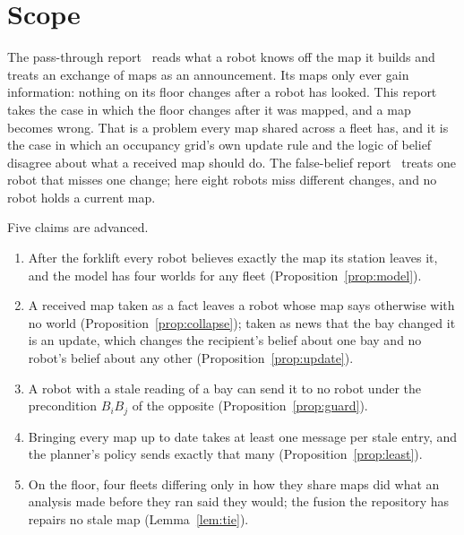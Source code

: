 \documentclass[11pt,a4paper]{article}
\theoremstyle{definition}
\newcommand{\Bop}[1]{B_{#1}}
\begin{document}
\tableofcontents
\newpage

\section{Scope}
\label{sec:scope}

The pass-through report~\cite{ulises2026pt} reads what a robot knows off the map
it builds and treats an exchange of maps as an announcement. Its maps only ever
gain information: nothing on its floor changes after a robot has looked. This
report takes the case in which the floor changes after it was mapped, and a map
becomes wrong. That is a problem every map shared across a fleet has, and it is
the case in which an occupancy grid's own update rule and the logic of belief
disagree about what a received map should do. The false-belief
report~\cite{ulises2026fb} treats one robot that misses one change; here eight
robots miss different changes, and no robot holds a current map.

Five claims are advanced.

\begin{enumerate}[leftmargin=1.4em, itemsep=2pt]
  \item After the forklift every robot believes exactly the map its station
        leaves it, and the model has four worlds for any fleet
        (Proposition~\ref{prop:model}).
  \item A received map taken as a fact leaves a robot whose map says otherwise
        with no world (Proposition~\ref{prop:collapse}); taken as news that the
        bay changed it is an update, which changes the recipient's belief about
        one bay and no robot's belief about any other (Proposition~\ref{prop:update}).
  \item A robot with a stale reading of a bay can send it to no robot under the
        precondition $\Bop{i}\Bop{j}$ of the opposite (Proposition~\ref{prop:guard}).
  \item Bringing every map up to date takes at least one message per stale entry,
        and the planner's policy sends exactly that many
        (Proposition~\ref{prop:least}).
  \item On the floor, four fleets differing only in how they share maps did what
        an analysis made before they ran said they would; the fusion the
        repository has repairs no stale map (Lemma~\ref{lem:tie}).
\end{enumerate}
\end{document}
